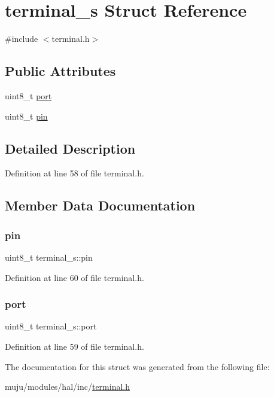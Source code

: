 \hypertarget{structterminal__s}{}\section{terminal\+\_\+s Struct Reference}
\label{structterminal__s}


{\ttfamily \#include $<$terminal.\+h$>$}

\subsection*{Public Attributes}
\begin{DoxyCompactItemize}
\item 
uint8\+\_\+t \hyperlink{structterminal__s_a74e657691331ad6af6680302a71d6f5f}{port}
\item 
uint8\+\_\+t \hyperlink{structterminal__s_a939bd610da8aca28f9bc57adccb3e420}{pin}
\end{DoxyCompactItemize}


\subsection{Detailed Description}


Definition at line 58 of file terminal.\+h.



\subsection{Member Data Documentation}
\mbox{\label{structterminal__s_a939bd610da8aca28f9bc57adccb3e420}} 
\subsubsection{\texorpdfstring{pin}{pin}}
{\footnotesize\ttfamily uint8\+\_\+t terminal\+\_\+s\+::pin}



Definition at line 60 of file terminal.\+h.

\mbox{\label{structterminal__s_a74e657691331ad6af6680302a71d6f5f}} 
\subsubsection{\texorpdfstring{port}{port}}
{\footnotesize\ttfamily uint8\+\_\+t terminal\+\_\+s\+::port}



Definition at line 59 of file terminal.\+h.



The documentation for this struct was generated from the following file\+:\begin{DoxyCompactItemize}
\item 
muju/modules/hal/inc/\hyperlink{terminal_8h}{terminal.\+h}\end{DoxyCompactItemize}
